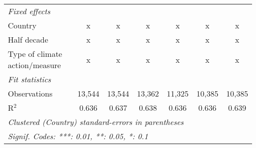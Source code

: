 \begin{tabular}{lcccccc}
   \emph{Fixed effects}\\
   Country                                                  & x       & x       & x       & x             & x             & x\\  
   Half decade                                              & x       & x       & x       & x             & x             & x\\  
   Type of climate action/measure                           & x       & x       & x       & x             & x             & x\\  
   \midrule \emph{Fit statistics}\\
   Observations                                             & 13,544  & 13,544  & 13,362  & 11,325        & 10,385        & 10,385\\  
   R$^2$                                                    & 0.636   & 0.637   & 0.638   & 0.636         & 0.636         & 0.639\\  
   \midrule
   \multicolumn{7}{l}{\emph{Clustered (Country) standard-errors in parentheses}}\\
   \multicolumn{7}{l}{\emph{Signif. Codes: ***: 0.01, **: 0.05, *: 0.1}}\\
\end{tabular}
\par\endgroup


